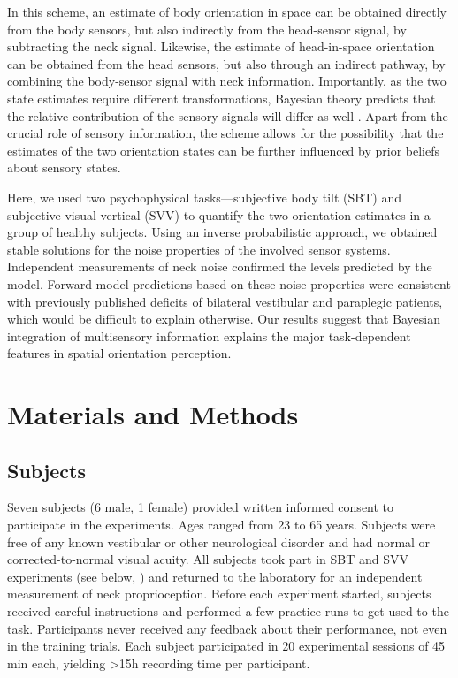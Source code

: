 In this scheme, an estimate of body orientation in space can be obtained directly from the body sensors, but also indirectly from the head-sensor signal, by subtracting the neck signal. Likewise, the estimate of head-in-space orientation can be obtained from the head sensors, but also through an indirect pathway, by combining the body-sensor signal with neck information. Importantly, as the two state estimates require different transformations, Bayesian theory predicts that the relative contribution of the sensory signals will differ as well \cite{mcguire2009}. Apart from the crucial role of sensory information, the scheme allows for the possibility that the estimates of the two orientation states can be further influenced by prior beliefs about sensory states. 

Here, we used two psychophysical tasks---subjective body tilt (SBT) and subjective visual vertical (SVV) to quantify the two orientation estimates in a group of healthy subjects. Using an inverse probabilistic approach, we obtained stable solutions for the noise properties of the involved sensor systems. Independent measurements of neck noise confirmed the levels predicted by the model. Forward model predictions based on these noise properties were consistent with previously published deficits of bilateral vestibular and paraplegic patients, which would be difficult to explain otherwise. Our results suggest that Bayesian integration of multisensory information explains the major task-dependent features in spatial orientation perception. 



\section{Materials and Methods}
\label{p1:sec:methods}

\subsection{Subjects}

Seven subjects (6 male, 1 female) provided written informed consent to participate in the experiments. Ages ranged from 23 to 65 years. Subjects were free of any known vestibular or other neurological disorder and had normal or corrected-to-normal visual acuity. All subjects took part in SBT and SVV experiments (see below, ) and returned to the laboratory for an independent measurement of neck proprioception. Before each experiment started, subjects received careful instructions and performed a few practice runs to get used to the task. Participants never received any feedback about their performance, not even in the training trials. Each subject participated in 20 experimental sessions of {\textapprox}45 min each, yielding {\textgreater}15h recording time per participant.

